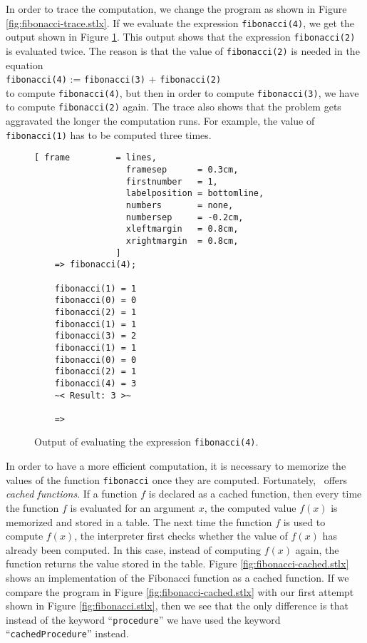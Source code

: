 In order to trace the computation, we change the program as shown in Figure
\ref{fig:fibonacci-trace.stlx}.  
If we evaluate the expression \texttt{fibonacci(4)}, we get the output shown in Figure
\ref{fig:fibonacci.trace}.  This output shows that the expression \texttt{fibonacci(2)} is
evaluated twice.  The reason is that the value of \texttt{fibonacci(2)} is needed in the equation
\\[0.2cm]
\hspace*{1.3cm}
\texttt{fibonacci(4)} := \texttt{fibonacci(3)} + \texttt{fibonacci(2)}
\\[0.2cm]
to compute \texttt{fibonacci(4)}, but then in order to compute \texttt{fibonacci(3)}, we
have to compute \texttt{fibonacci(2)} again.  The trace also shows that the problem gets
aggravated the longer the computation runs.  For example, the value of
\texttt{fibonacci(1)} has to be computed three times.

\begin{figure}[!ht]
\centering
\begin{Verbatim}[ frame         = lines, 
                  framesep      = 0.3cm, 
                  firstnumber   = 1,
                  labelposition = bottomline,
                  numbers       = none,
                  numbersep     = -0.2cm,
                  xleftmargin   = 0.8cm,
                  xrightmargin  = 0.8cm,
                ]
    => fibonacci(4);
    
    fibonacci(1) = 1
    fibonacci(0) = 0
    fibonacci(2) = 1
    fibonacci(1) = 1
    fibonacci(3) = 2
    fibonacci(1) = 1
    fibonacci(0) = 0
    fibonacci(2) = 1
    fibonacci(4) = 3
    ~< Result: 3 >~
    
    => 
\end{Verbatim}
\vspace*{-0.3cm}
\caption{Output of evaluating the expression \texttt{fibonacci(4)}.}
\label{fig:fibonacci.trace}
\end{figure}


In order to have a more efficient computation, it is necessary to memorize the values of
the function \texttt{fibonacci} once they are computed.  Fortunately, \setlx\ offers
\emph{cached functions}.  If a function $f$ is declared as a cached function, then every
time the function $f$ is evaluated for an argument $x$, the computed value $f(x)$ is
memorized and stored in a table.  The next time the function $f$ is used to compute
$f(x)$, the interpreter first checks whether the value of $f(x)$ has already been
computed.  In this case, instead of computing $f(x)$ again,  the function returns the
value stored in the table.  Figure
\ref{fig:fibonacci-cached.stlx} shows an implementation of the Fibonacci function as a
cached function.  If we compare the program in Figure
\ref{fig:fibonacci-cached.stlx} with our first attempt shown in Figure
\ref{fig:fibonacci.stlx}, then we see that the only difference is that instead of the
keyword ``\texttt{procedure}'' we have used the keyword ``\texttt{cachedProcedure}'' instead.


